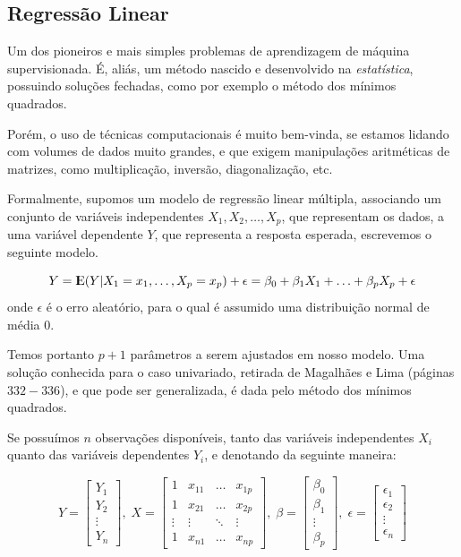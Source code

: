 \subsection{Regressão Linear}

Um dos pioneiros e mais simples problemas de aprendizagem de máquina supervisionada. É, aliás, um método nascido e desenvolvido na \emph{estatística}, possuindo soluções fechadas, como por exemplo o método dos mínimos quadrados. 

Porém, o uso de técnicas computacionais é muito bem-vinda, se estamos lidando com volumes de dados muito grandes, e que exigem manipulações aritméticas de matrizes, como multiplicação, inversão, diagonalização, etc.

Formalmente, supomos um modelo de regressão linear múltipla, associando um conjunto de variáveis independentes $X_1, X_2, \ldots, X_p$, que representam os dados, a uma variável dependente $Y$, que representa a resposta esperada, escrevemos o seguinte modelo.

\begin{equation}\label{algo:1}
Y = {\rm I\kern-.3em E}(Y|X_1 = x_1, \ldots, X_p = x_p) + \epsilon = \beta_0 + \beta_1 X_1 + \ldots + \beta_p X_p + \epsilon
\end{equation}
onde $\epsilon$ é o erro aleatório, para o qual é assumido uma distribuição normal de média $0$.

Temos portanto $p{+}1$ parâmetros a serem ajustados em nosso modelo. Uma solução conhecida para o caso univariado, retirada de Magalhães e Lima \citep{antonio} (páginas $332{-}336$), e que pode ser generalizada, é dada pelo método dos mínimos quadrados. 

Se possuímos $n$ observações disponíveis, tanto das variáveis independentes $X_i$ quanto das variáveis dependentes $Y_i$, e denotando da seguinte maneira:

\[
Y = \left[ \begin{array}{c} Y_1 \\ Y_2 \\ \vdots \\ Y_n \end{array} \right], \;
X = \left[ \begin{array}{cccc} 1 & x_{11} & \ldots & x_{1p} \\ 1 & x_{21} & \ldots & x_{2p} \\ \vdots & \vdots & \ddots & \vdots \\ 1 & x_{n1} & \ldots & x_{np} \end{array} \right], \;
\beta = \left[ \begin{array}{c} \beta_0 \\ \beta_1 \\ \vdots \\ \beta_p \end{array} \right], \;
\epsilon = \left[ \begin{array}{c} \epsilon_1 \\ \epsilon_2 \\ \vdots \\ \epsilon_n \end{array} \right]
\]

